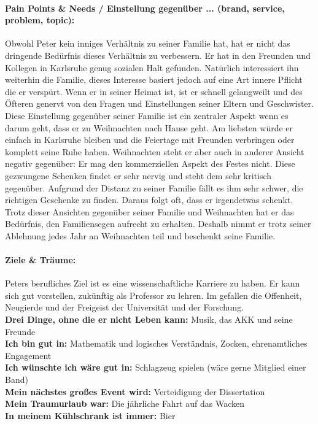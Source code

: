 \documentclass[12pt,ngerman, fleqn]{book} %
\begin{document}
\paragraph{Pain Points & Needs / Einstellung gegenüber ... (brand, service, problem, topic):}
Obwohl Peter kein inniges Verhältnis zu seiner Familie hat, hat er nicht das dringende Bedürfnis dieses Verhältnis zu verbessern. Er hat in den Freunden und Kollegen in Karlsruhe genug sozialen Halt gefunden. Natürlich interessiert ihn weiterhin die Familie, dieses Interesse basiert jedoch auf eine Art innere Pflicht die er verspürt. Wenn er in  seiner Heimat ist, ist er schnell gelangweilt und des Öfteren genervt von den Fragen und Einstellungen seiner Eltern und Geschwister.
Diese Einstellung gegenüber seiner Familie ist ein zentraler Aspekt wenn es darum geht, dass er zu Weihnachten nach Hause geht. Am liebsten würde er einfach in Karlsruhe bleiben und die Feiertage mit Freunden verbringen oder komplett seine Ruhe haben. Weihnachten steht er aber auch in anderer Ansicht negativ gegenüber: Er mag den kommerziellen Aspekt des Festes nicht. Diese gezwungene Schenken findet er sehr nervig und steht dem sehr kritisch gegenüber. Aufgrund der Distanz zu seiner Familie fällt es ihm sehr schwer, die richtigen Geschenke zu finden. Daraus folgt oft, dass er irgendetwas schenkt. Trotz dieser Ansichten gegenüber seiner Familie und Weihnachten hat er das Bedürfnis, den Familiensegen aufrecht zu erhalten. Deshalb nimmt er trotz seiner Ablehnung jedes Jahr an Weihnachten teil und beschenkt seine Familie.\\
\hline
\paragraph{Ziele & Träume:}
Peters berufliches Ziel ist es eine wissenschaftliche Karriere zu haben. Er kann sich gut vorstellen, zukünftig als Professor zu lehren. Im gefallen die Offenheit, Neugierde und der Freigeist der Universität und der Forschung.\\
\hline
\textbf{Drei Dinge, ohne die er nicht Leben kann:} Musik, das AKK und seine Freunde \\
\textbf{Ich bin gut in:} Mathematik und logisches Verständnis, Zocken,  ehrenamtliches Engagement \\
\textbf{Ich wünschte ich wäre gut in:} Schlagzeug spielen (wäre gerne Mitglied einer Band) \\
\textbf{Mein nächstes großes Event wird:} Verteidigung der Dissertation \\
\textbf{Mein Traumurlaub war:} Die jährliche Fahrt auf das Wacken \\
\textbf{In meinem Kühlschrank ist immer:} Bier \\
\hline
\end{document}
